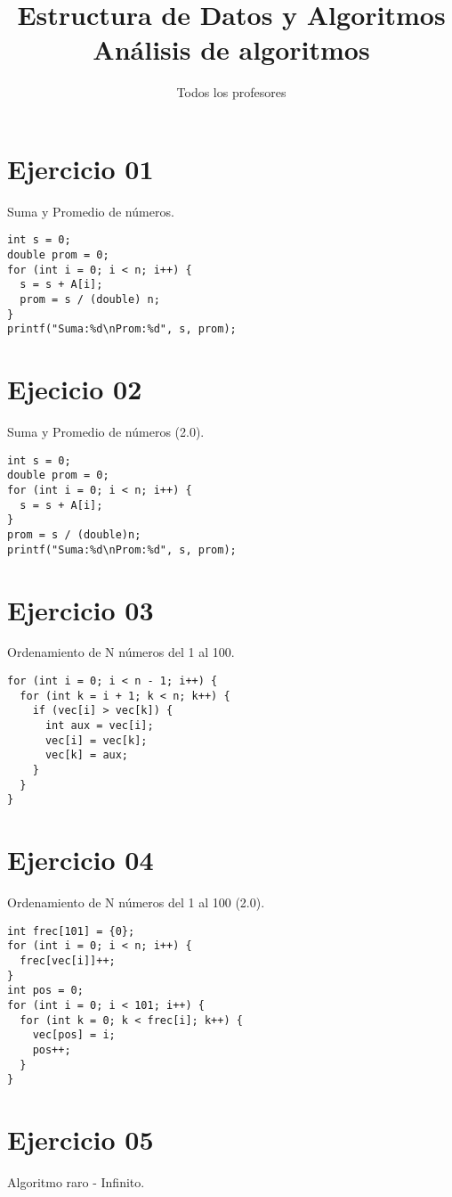 \documentclass{article}
\title{Estructura de Datos y Algoritmos \\
  \large Análisis de algoritmos}
\author{Todos los profesores}
\date{\the\year}
\begin{document}
\maketitle


\section{Ejercicio 01}
Suma y Promedio de números.

\begin{lstlisting}
int s = 0;
double prom = 0;
for (int i = 0; i < n; i++) {
  s = s + A[i];
  prom = s / (double) n;
}
printf("Suma:%d\nProm:%d", s, prom);
\end{lstlisting}

\section{Ejecicio 02}
Suma y Promedio de números (2.0).

\begin{lstlisting}
int s = 0;
double prom = 0;
for (int i = 0; i < n; i++) {
  s = s + A[i];
}
prom = s / (double)n;
printf("Suma:%d\nProm:%d", s, prom);
\end{lstlisting}

\section{Ejercicio 03}
Ordenamiento de N números del 1 al 100.

\begin{lstlisting}
for (int i = 0; i < n - 1; i++) {
  for (int k = i + 1; k < n; k++) {
    if (vec[i] > vec[k]) {
      int aux = vec[i];
      vec[i] = vec[k];
      vec[k] = aux;
    }
  }
}
\end{lstlisting}

\pagebreak
\section{Ejercicio 04}
Ordenamiento de N números del 1 al 100 (2.0).

\begin{lstlisting}
int frec[101] = {0};
for (int i = 0; i < n; i++) {
  frec[vec[i]]++;
}
int pos = 0;
for (int i = 0; i < 101; i++) {
  for (int k = 0; k < frec[i]; k++) {
    vec[pos] = i;
    pos++;
  }
}
\end{lstlisting}

\section{Ejercicio 05}
Algoritmo raro - Infinito.
\end{document}
